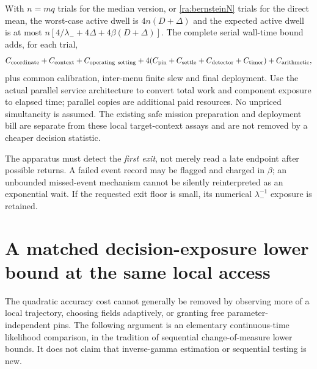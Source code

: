 With $n=mq$ trials for the median version, or \eqref{ra:bernsteinN}
trials for the direct mean, the worst-case active dwell is
$4n(D+\Delta)$ and the expected active dwell is at most
$n[4/\lambda_-+4\Delta+4\beta(D+\Delta)]$.
The complete serial wall-time bound adds, for each trial,
\[
 C_{\rm coordinate}+C_{\rm context}+C_{\rm operating\ setting}
 +4(C_{\rm pin}+C_{\rm settle}+C_{\rm detector}+C_{\rm timer})
 +C_{\rm arithmetic},
\]
plus common calibration, inter-menu finite slew and final deployment.
Use the actual parallel service architecture to convert total work and
component exposure to elapsed time; parallel copies are additional paid
resources. No unpriced simultaneity is assumed. The existing safe mission
preparation and deployment bill are separate from these local target-context
assays and are not removed by a cheaper decision statistic.

The apparatus must detect the \emph{first exit}, not merely read a late
endpoint after possible returns. A failed event record may be flagged
and charged in $\beta$; an unbounded missed-event mechanism cannot be
silently reinterpreted as an exponential wait. If the requested exit
floor is small, its numerical $\lambda_-^{-1}$ exposure is retained.

\section{A matched decision-exposure lower bound at the same local access}
\label{sec:rate_lower}
The quadratic accuracy cost cannot generally be removed by observing more
of a local trajectory, choosing fields adaptively, or granting free
parameter-independent pins. The following argument is an elementary
continuous-time likelihood comparison, in the tradition of sequential
change-of-measure lower bounds. It does not claim that inverse-gamma
estimation or sequential testing is new.

